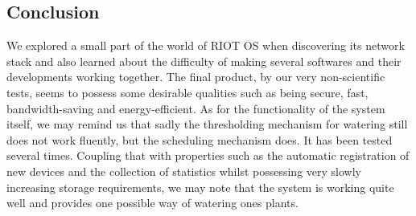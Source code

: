 \documentclass[acmtog, language=english, nonacm]{acmart}
\begin{document}
    \subsection{Conclusion}

    We explored a small part of the world of RIOT OS when discovering its network stack and also learned about the difficulty of making several softwares and their developments working together. The final product, by our very non-scientific tests, seems to possess some desirable qualities such as being secure, fast, bandwidth-saving and energy-efficient. As for the functionality of the system itself, we may remind us that sadly the thresholding mechanism for watering still does not work fluently, but the scheduling mechanism does. It has been tested several times. Coupling that with properties such as the automatic registration of new devices and the collection of statistics whilst possessing very slowly increasing storage requirements, we may note that the system is working quite well and provides one possible way of watering ones plants.

    
    

\end{document}
